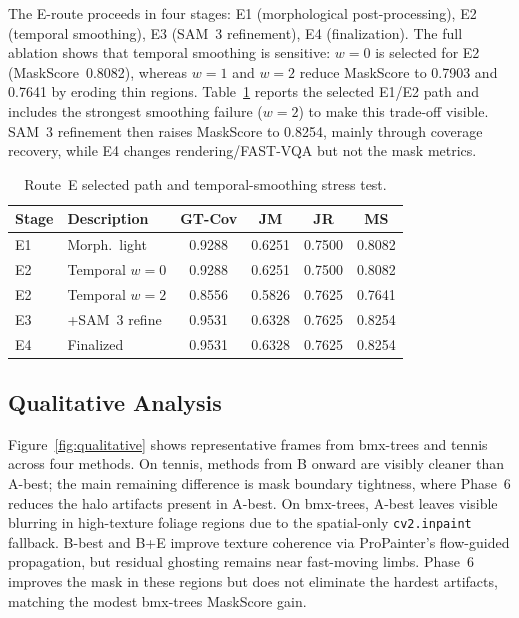 The E-route proceeds in four stages: E1 (morphological post-processing), E2 (temporal
smoothing), E3 (SAM~3 refinement), E4 (finalization). The full ablation shows that
temporal smoothing is sensitive: $w{=}0$ is selected for E2 (MaskScore~0.8082), whereas
$w{=}1$ and $w{=}2$ reduce MaskScore to 0.7903 and 0.7641 by eroding thin regions.
Table~\ref{tab:ablation_e} reports the selected E1/E2 path and includes the strongest
smoothing failure ($w{=}2$) to make this trade-off visible. SAM~3 refinement then raises
MaskScore to 0.8254, mainly through coverage recovery, while E4 changes rendering/FAST-VQA
but not the mask metrics.

\begin{table}[t]
\centering
\caption{Route~E selected path and temporal-smoothing stress test.}
\label{tab:ablation_e}
\setlength{\tabcolsep}{3pt}
\small
\begin{tabular}{lp{2cm}cccc}
\toprule
Stage & Description & GT-Cov & JM & JR & MS \\
\midrule
E1 & Morph.\ light       & 0.9288 & 0.6251 & 0.7500 & 0.8082 \\
E2 & Temporal $w{=}0$    & 0.9288 & 0.6251 & 0.7500 & 0.8082 \\
E2 & Temporal $w{=}2$    & 0.8556 & 0.5826 & 0.7625 & 0.7641 \\
E3 & +SAM~3 refine       & 0.9531 & 0.6328 & 0.7625 & 0.8254 \\
E4 & Finalized           & 0.9531 & 0.6328 & 0.7625 & 0.8254 \\
\bottomrule
\end{tabular}
\end{table}

\subsection{Qualitative Analysis}
\label{sec:exp:qualitative}

Figure~\ref{fig:qualitative} shows representative frames from bmx-trees and tennis
across four methods. On tennis, methods from B onward are visibly cleaner than A-best;
the main remaining difference is mask boundary tightness, where Phase~6 reduces the
halo artifacts present in A-best. On bmx-trees, A-best leaves visible blurring in
high-texture foliage regions due to the spatial-only \texttt{cv2.inpaint} fallback.
B-best and B+E improve texture coherence via ProPainter's flow-guided propagation,
but residual ghosting remains near fast-moving limbs. Phase~6 improves the mask in these
regions but does not eliminate the hardest artifacts, matching the modest bmx-trees
MaskScore gain.


